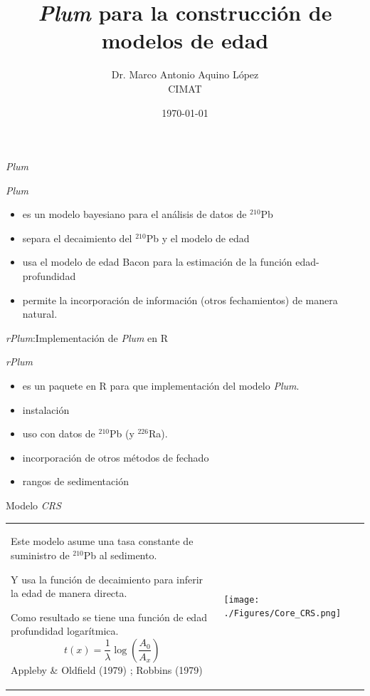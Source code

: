 \documentclass{beamer}
\title{\textit{Plum} para la construcción de modelos de edad}
\author{Dr. Marco Antonio Aquino López\\ CIMAT}
\date{\today}
\begin{document}
    \begin{frame}
    \maketitle
    \end{frame}

\begin{frame}{\textit{Plum} } 
	\begin{block}{\textit{Plum} }
		\begin{itemize}
			\item{ es un modelo bayesiano para el análisis de datos de $^{210}$Pb }
			\item{ separa el decaimiento del $^{210}$Pb y el modelo de edad}
			\item{ usa el modelo de edad Bacon para la estimación de la función edad-profundidad }
			\item{ permite la incorporación de información (otros fechamientos) de manera natural. }
		\end{itemize}
	\end{block}
\end{frame} 


\begin{frame}{\textit{rPlum}:Implementación de \textit{Plum} en R}
	\begin{block}{\textit{rPlum}}
		\begin{itemize}
			\item{ es un paquete en R para que implementación del modelo \textit{Plum}. }
			\item{ instalación}
			\item{ uso con datos de $^{210}$Pb (y $^{226}$Ra).}
			\item{ incorporación de otros métodos de fechado}
			\item{ rangos de sedimentación}
		\end{itemize}
	\end{block} 
\end{frame} 

\begin{frame}{Modelo \textit{CRS}}
	\begin{center}
		\begin{tabular}{p{7.51cm}p{2.51cm}}
			Este modelo asume una tasa constante de suministro de $^{210}$Pb al sedimento.

			Y usa la función de decaimiento para inferir la edad de manera directa. 

			Como resultado se tiene una función de edad profundidad logarítmica. 
			$$t(x) = \frac{1}{\lambda}\log\left( \frac{A_0}{A_x} \right)$$ Appleby \& Oldfield (1979) ; Robbins (1979)   
			& 
 			\begin{minipage}{0.85\textwidth}
				\texttt{[image: ./Figures/Core\_CRS.png]} 
			\end{minipage}
		\end{tabular}
	\end{center}
\end{frame} 
\end{document}
